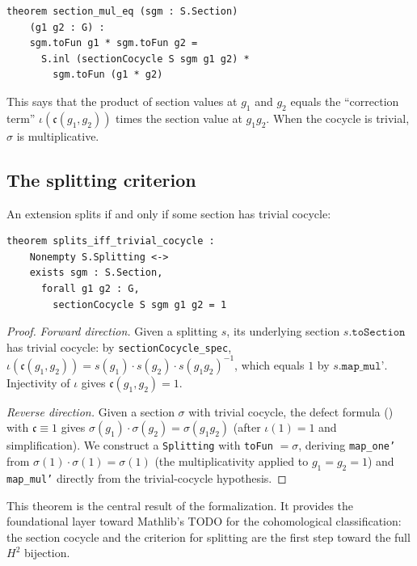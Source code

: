 \documentclass[11pt]{article}
\newcommand{\cocy}{\mathfrak{c}}
\newcommand{\lean}[1]{\texttt{#1}}
\begin{document}
\begin{theorem}\label{thm:defect}
\begin{lstlisting}
theorem section_mul_eq (sgm : S.Section)
    (g1 g2 : G) :
    sgm.toFun g1 * sgm.toFun g2 =
      S.inl (sectionCocycle S sgm g1 g2) *
        sgm.toFun (g1 * g2)
\end{lstlisting}
\end{theorem}

\noindent
This says that the product of section values at $g_1$ and $g_2$ equals the
``correction term'' $\iota(\cocy(g_1, g_2))$ times the section value at $g_1 g_2$.
When the cocycle is trivial, $\sigma$ is multiplicative.

\subsection{The splitting criterion}\label{sec:split-criterion}

\begin{theorem}\label{thm:split-criterion}
An extension splits if and only if some section has trivial cocycle:
\begin{lstlisting}
theorem splits_iff_trivial_cocycle :
    Nonempty S.Splitting <->
    exists sgm : S.Section,
      forall g1 g2 : G,
        sectionCocycle S sgm g1 g2 = 1
\end{lstlisting}
\end{theorem}

\begin{proof}
\emph{Forward direction.}  Given a splitting $s$, its underlying section
$s.\lean{toSection}$ has trivial cocycle: by \lean{sectionCocycle\_spec},
$\iota(\cocy(g_1, g_2)) = s(g_1) \cdot s(g_2) \cdot s(g_1 g_2)^{-1}$, which
equals $1$ by $s.\lean{map\_mul'}$.  Injectivity of $\iota$ gives
$\cocy(g_1, g_2) = 1$.

\emph{Reverse direction.}  Given a section $\sigma$ with trivial cocycle, the
defect formula () with $\cocy \equiv 1$ gives
$\sigma(g_1) \cdot \sigma(g_2) = \sigma(g_1 g_2)$ (after $\iota(1) = 1$ and
simplification).  We construct a \lean{Splitting} with \lean{toFun} $= \sigma$,
deriving \lean{map\_one'} from $\sigma(1) \cdot \sigma(1) = \sigma(1)$ (the
multiplicativity applied to $g_1 = g_2 = 1$) and \lean{map\_mul'} directly from
the trivial-cocycle hypothesis.
\end{proof}

This theorem is the central result of the formalization.  It provides the
foundational layer toward Mathlib's TODO for the cohomological classification:
the section cocycle and the criterion for splitting are the first step toward
the full $H^2$ bijection.
\end{document}

